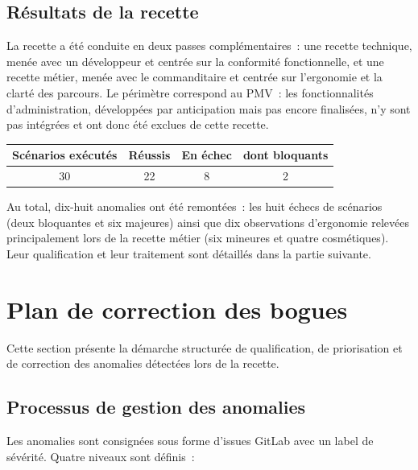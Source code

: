 \subsection{Résultats de la recette}
La recette a été conduite en deux passes complémentaires~: une recette technique, menée avec un développeur et centrée sur la conformité fonctionnelle, et une recette métier, menée avec le commanditaire et centrée sur l'ergonomie et la clarté des parcours. Le périmètre correspond au PMV~: les fonctionnalités d'administration, développées par anticipation mais pas encore finalisées, n'y sont pas intégrées et ont donc été exclues de cette recette.

\begin{table}[H]
    \centering
    \begin{tabular}{|c|c|c|c|}
        \hline
        \textbf{Scénarios exécutés} & \textbf{Réussis} & \textbf{En échec} & \textbf{dont bloquants} \\
        \hline
        30 & 22 & 8 & 2 \\
        \hline
    \end{tabular}
\end{table}

Au total, dix-huit anomalies ont été remontées~: les huit échecs de scénarios (deux bloquantes et six majeures) ainsi que dix observations d'ergonomie relevées principalement lors de la recette métier (six mineures et quatre cosmétiques). Leur qualification et leur traitement sont détaillés dans la partie suivante.


\section{Plan de correction des bogues}\label{sec:plan-correction}

Cette section présente la démarche structurée de qualification, de priorisation et de correction des anomalies détectées lors de la recette.

\subsection{Processus de gestion des anomalies}
Les anomalies sont consignées sous forme d'issues GitLab avec un label de sévérité. Quatre niveaux sont définis~:

